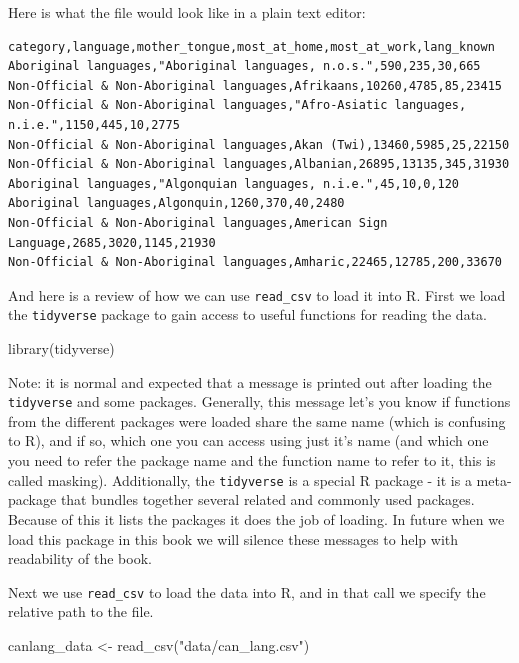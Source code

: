 \documentclass[
]{krantz}
\makeatletter
\newenvironment{Shaded}{\begin{snugshade}}{\end{snugshade}}
\newcommand{\FunctionTok}[1]{\textcolor[rgb]{0,0,0}{#1}}
\newcommand{\NormalTok}[1]{#1}
\newcommand{\OtherTok}[1]{\textcolor[rgb]{0.37,0.37,0.37}{#1}}
\newcommand{\StringTok}[1]{\textcolor[rgb]{0.5,0.5,0.5}{#1}}
\renewenvironment{quote}{\begin{VF}}{\end{VF}}
\newenvironment{kframe}{%
\medskip{}
\setlength{\fboxsep}{.8em}
 \def\at@end@of@kframe{}%
 \ifinner\ifhmode%
  \def\at@end@of@kframe{\end{minipage}}%
  \begin{minipage}{\columnwidth}%
 \fi\fi%
 \def\FrameCommand##1{\hskip\@totalleftmargin \hskip-\fboxsep
 \colorbox{shadecolor}{##1}\hskip-\fboxsep
     \hskip-\linewidth \hskip-\@totalleftmargin \hskip\columnwidth}%
 \MakeFramed {\advance\hsize-\width
   \@totalleftmargin\z@ \linewidth\hsize
   \@setminipage}}%
 {\par\unskip\endMakeFramed%
 \at@end@of@kframe}
\renewenvironment{Shaded}{\begin{kframe}}{\end{kframe}}
\makeatother
\begin{document}
Here is what the file would look like in a plain text editor:

\begin{verbatim}
category,language,mother_tongue,most_at_home,most_at_work,lang_known
Aboriginal languages,"Aboriginal languages, n.o.s.",590,235,30,665
Non-Official & Non-Aboriginal languages,Afrikaans,10260,4785,85,23415
Non-Official & Non-Aboriginal languages,"Afro-Asiatic languages, n.i.e.",1150,445,10,2775
Non-Official & Non-Aboriginal languages,Akan (Twi),13460,5985,25,22150
Non-Official & Non-Aboriginal languages,Albanian,26895,13135,345,31930
Aboriginal languages,"Algonquian languages, n.i.e.",45,10,0,120
Aboriginal languages,Algonquin,1260,370,40,2480
Non-Official & Non-Aboriginal languages,American Sign Language,2685,3020,1145,21930
Non-Official & Non-Aboriginal languages,Amharic,22465,12785,200,33670
\end{verbatim}

And here is a review of how we can use \texttt{read\_csv} to load it into R. First we
load the \texttt{tidyverse} package to gain access to useful functions for reading the
data.

\begin{Shaded}
\begin{Highlighting}[]
\FunctionTok{library}\NormalTok{(tidyverse)}
\end{Highlighting}
\end{Shaded}

\begin{quote}
Note: it is normal and expected that a message is printed out after
loading the \texttt{tidyverse} and some packages. Generally, this message let's you
know if functions from the different packages were loaded share the same name
(which is confusing to R), and if so, which one you can access using just it's
name (and which one you need to refer the package name and the function name to
refer to it, this is called masking). Additionally, the \texttt{tidyverse} is a special
R package - it is a meta-package that bundles together several
related and commonly used packages. Because of this it lists the packages it
does the job of loading. In future when we load this package in this book we
will silence these messages to help with readability of the book.
\end{quote}

Next we use \texttt{read\_csv} to load the data into R, and in that call we specify the
relative path to the file.

\begin{Shaded}
\begin{Highlighting}[]
\NormalTok{canlang\_data }\OtherTok{\textless{}{-}} \FunctionTok{read\_csv}\NormalTok{(}\StringTok{"data/can\_lang.csv"}\NormalTok{)}
\end{Highlighting}
\end{Shaded}
\end{document}
